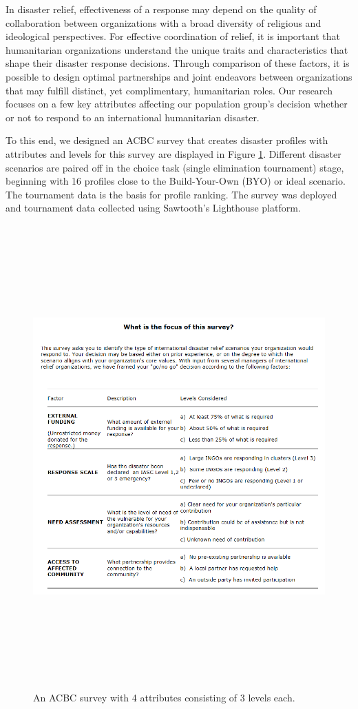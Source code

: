 \documentclass[a4paper, 12pt]{article}
\begin{document}
In disaster relief, effectiveness of a response may depend on the quality of collaboration between organizations with a broad diversity of religious and ideological perspectives. For effective coordination of relief, it is important that humanitarian organizations understand the unique traits and characteristics that shape their disaster response decisions. Through comparison of these factors, it is possible to design optimal partnerships and joint endeavors between organizations that may fulfill distinct, yet complimentary, humanitarian roles. Our research focuses on a few key attributes affecting our population group's decision whether or not to respond to an international humanitarian disaster.


To this end, we designed an ACBC survey that creates disaster profiles with attributes and levels for this survey are displayed in Figure \ref{AL}. Different disaster scenarios are paired off  in the choice task (single elimination tournament) stage, beginning with 16 profiles close to the Build-Your-Own (BYO) or ideal scenario. The tournament data is the basis for profile ranking. The survey was deployed and tournament data collected using Sawtooth's Lighthouse platform.



\begin{figure}[!htpb]
\centering
\includegraphics[width=5.75in, height=7in]{AttributeLevels.png}
\caption{{\small An ACBC survey with 4 attributes consisting of 3 levels each. }}
\label{AL}
\end{figure}
\end{document}
